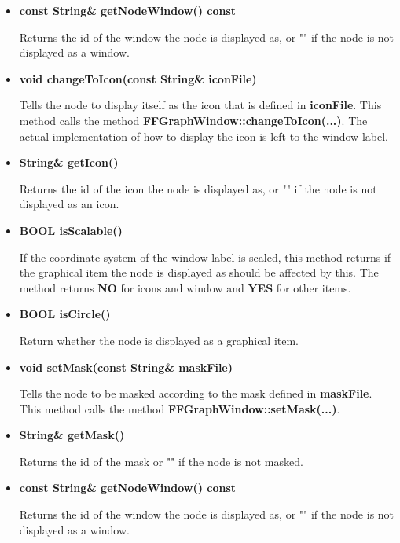 \begin{itemize}
  Tells the node to display itself as a window that may contain a
  graph.  This method calls the method {\bf
    FFGraphWindow::changeToWindow(...)}. The actual
  implementation of how to display the window is left to the
  window label.

\item{\bf const String\& getNodeWindow() const}
  
  Returns the id of the window the node is displayed as, or "" if
  the node is not displayed as a window.

\item{\bf void changeToIcon(const String\& iconFile)}
  
  Tells the node to display itself as the icon that is defined in
  {\bf iconFile}.  This method calls the method {\bf
    FFGraphWindow::changeToIcon(...)}. The actual implementation
  of how to display the icon is left to the window label.

\item{\bf String\& getIcon()}

  Returns the id of the icon the node is displayed as, or "" if
  the node is not displayed as an icon.

\item{\bf BOOL isScalable()}
  
  If the coordinate system of the window label is scaled, this
  method returns if the graphical item the node is displayed as
  should be affected by this. The method returns {\bf NO} for
  icons and window and {\bf YES}  for other items.

\item{\bf BOOL isCircle()}

  Return whether the node is displayed as a graphical item.

\item{\bf void setMask(const String\& maskFile)}
  
  Tells the node to be masked according to the mask defined in
  {\bf maskFile}. This method calls the method {\bf
    FFGraphWindow::setMask(...)}. 

\item{\bf String\& getMask()}

  Returns the id of the mask or "" if the node is not masked.

\item{\bf const String\& getNodeWindow() const}
  
  Returns the id of the window the node is displayed as, or "" if
  the node is not displayed as a window.


\end{itemize}
